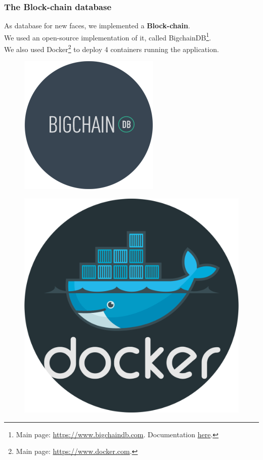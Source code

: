 \begin{frame} \frametitle{The Block-chain database} 
	\begin{center}
		As database for new faces, we implemented a \textbf{Block-chain}. \\ 
		We used an open-source implementation of it, called 
		BigchainDB\footnote{Main page: {\color{red} 
		\url{https://www.bigchaindb.com}}. Documentation {\color{red}
		\href{http://docs.bigchaindb.com/projects/server/en/latest/introduction.html}
		{here}}.}. \\ We also used Docker\footnote{Main page: {\color{red} 
		\url{https://www.docker.com}}.} to deploy 4 containers running the
		application.
	\end{center}
	\vfill
	\begin{minipage}{.45\textwidth}
		\begin{figure}[H]
			\includegraphics[width=.8\textwidth]{img/bchaindb}
		\end{figure}
	\end{minipage}
	\hfill
	\begin{minipage}{.45\textwidth}
		\begin{figure}[H]
			\includegraphics[width=.8\textwidth]{img/dockerlogo}

\end{figure}
\end{minipage}
\end{frame}
